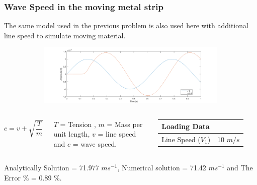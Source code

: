 \documentclass[9pt]{beamer}
\begin{document}
\begin{frame}
\frametitle{Wave Speed in the moving metal strip}
The same model used in the previous problem is also used here with additional line speed to simulate moving material.

\begin{figure}[h!]
\centering
\begin{subfigure}{1\textwidth}
\includegraphics[width=\linewidth,trim={0 0 0 0},clip]{wavespeed.png}
\end{subfigure} 

\end{figure}
\begin{columns}

\begin{equation*}
c=v+\sqrt{\frac{T}{m}}
\end{equation*}
 
 $T$ = Tension , $m$ = Mass per unit length, $v$ = line speed and $c$ = wave speed. 




\begin{table}[ht]
\renewcommand{\arraystretch}{1.5}
\centering
\begin{tabular}{ll}
\hline
                \multicolumn{2}{l}{Loading Data} \\ \hline  \hline
            Line Speed ($V_1$)        &10 $m/s$   \\
             \hline
\end{tabular}
\end{table}
\end{columns}
Analytically Solution = 71.977 $ms^{-1}$, Numerical solution = 71.42 $ms^{-1}$ and The 
Error $\%$ = 0.89 $\%$.
\end{frame}
\end{document}
